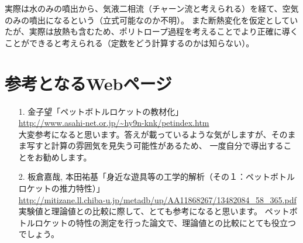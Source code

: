 \documentclass{article}
\begin{document}
実際は水のみの噴出から、気液二相流（チャーン流と考えられる）を経て、空気のみの噴出になるという（立式可能なのか不明）。
また断熱変化を仮定としていたが、実際は放熱も含むため、ポリトロープ過程を考えることでより正確に導くことができると考えられる（定数をどう計算するのかは知らない）。

\section{ 参考となるWebページ }

\begin{itemize}
\item[1.] 金子望「ペットボトルロケットの教材化」\\ \url{http://www.asahi-net.or.jp/~hy9n-knk/petindex.htm}
       \\ 大変参考になると思います。答えが載っているような気がしますが、そのまま写すと計算の雰囲気を見失う可能性があるため、
	      一度自分で導出することをお勧めします。
\item[2.] 板倉嘉哉, 本田祐基「身近な遊具等の工学的解析（その１：ペットボトルロケットの推力特性）」 \\ \url{http://mitizane.ll.chiba-u.jp/metadb/up/AA11868267/13482084_58_365.pdf}
       \\ 実験値と理論値との比較に際して、とても参考になると思います。
	      ペットボトルロケットの特性の測定を行った論文で、理論値との比較にとても役立つでしょう。
\end{itemize}
\end{document}
